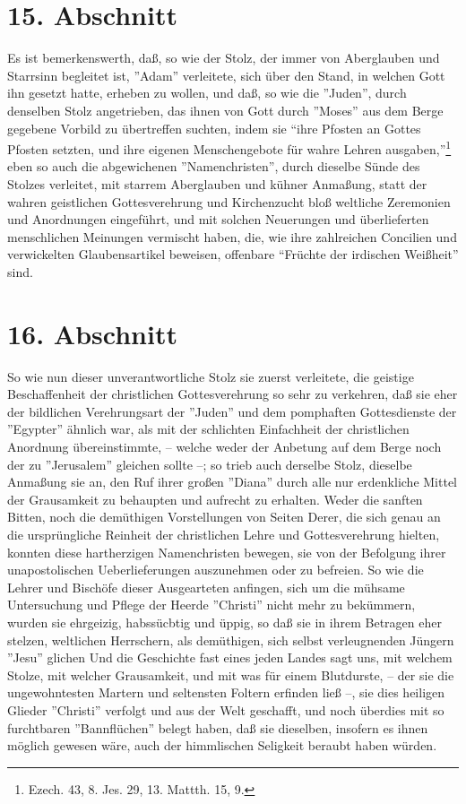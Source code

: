 \section{15. Abschnitt}

Es ist bemerkenswerth, daß, so wie der Stolz, der immer von Aberglauben und Starrsinn begleitet ist, ''Adam'' verleitete, sich über den Stand, in welchen Gott ihn gesetzt hatte, erheben zu wollen, und daß, so wie die ''Juden'', durch denselben Stolz angetrieben, das ihnen von Gott durch ''Moses'' aus dem Berge gegebene Vorbild zu übertreffen suchten, indem sie "`ihre Pfosten an Gottes Pfosten setzten, und ihre eigenen Menschengebote für wahre Lehren ausgaben,"'\footnote{Ezech. 43, 8. Jes. 29, 13. Mattth. 15, 9.} eben so auch die abgewichenen ''Namenchristen'', durch dieselbe Sünde des Stolzes verleitet, mit starrem Aberglauben und kühner Anmaßung, statt der wahren geistlichen Gottesverehrung und Kirchenzucht bloß weltliche Zeremonien und Anordnungen eingeführt, und mit solchen Neuerungen und überlieferten menschlichen Meinungen vermischt haben, die, wie ihre zahlreichen Concilien und verwickelten Glaubensartikel beweisen, offenbare "`Früchte der irdischen Weißheit"' sind.

\section{16. Abschnitt}

So wie nun dieser unverantwortliche Stolz sie zuerst verleitete, die geistige Beschaffenheit der christlichen Gottesverehrung so sehr zu verkehren, daß sie eher der bildlichen Verehrungsart der ''Juden'' und dem pomphaften Gottesdienste der ''Egypter'' ähnlich war, als mit der schlichten Einfachheit der christlichen Anordnung übereinstimmte, -- welche weder der Anbetung auf dem Berge noch der zu ''Jerusalem'' gleichen sollte --; so trieb auch derselbe Stolz, dieselbe Anmaßung sie an, den Ruf ihrer großen ''Diana'' durch alle nur erdenkliche Mittel der Grausamkeit zu behaupten und aufrecht zu erhalten. Weder die sanften Bitten, noch die demüthigen Vorstellungen von Seiten Derer, die sich genau an die ursprüngliche Reinheit der christlichen Lehre und Gottesverehrung hielten, konnten diese hartherzigen Namenchristen bewegen, sie von der Befolgung ihrer unapostolischen Ueberlieferungen auszunehmen oder zu befreien. So wie die Lehrer und Bischöfe dieser Ausgearteten anfingen, sich um die mühsame Untersuchung und Pflege der Heerde ''Christi'' nicht mehr zu bekümmern, wurden sie ehrgeizig, habssücbtig und üppig, so daß sie in ihrem Betragen eher stelzen, weltlichen Herrschern, als demüthigen, sich selbst verleugnenden Jüngern ''Jesu'' glichen Und die Geschichte fast eines jeden Landes sagt uns, mit welchem Stolze, mit welcher Grausamkeit, und mit was für einem Blutdurste, -- der sie die ungewohntesten Martern und seltensten Foltern erfinden ließ --, sie dies heiligen Glieder ''Christi'' verfolgt und aus der Welt geschafft, und noch überdies mit so furchtbaren ''Bannflüchen'' belegt haben, daß sie dieselben, insofern es ihnen möglich gewesen wäre, auch der himmlischen Seligkeit beraubt haben würden.

